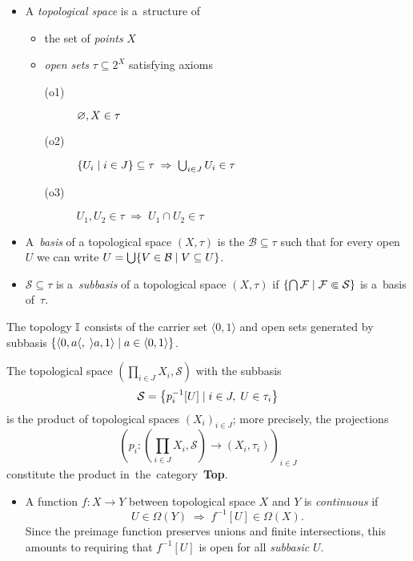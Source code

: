 \begin{itemize}
\item A \emph{topological space} is a~structure of
  \begin{itemize}
  \item the set of \emph{points\/} $X$
  \item \emph{open sets\/} $\tau\subseteq 2^X$ satisfying axioms
    \begin{description}
    \item[(o1)] $\varnothing, X \in \tau$
    \item[(o2)] $\left\{ U_i \mid i\in J \right\} \subseteq \tau \; \Rightarrow
    \; \bigcup_{i\in J} U_i \in \tau$
    \item[(o3)] $U_1, U_2 \in \tau \; \Rightarrow \; U_1 \cap U_2 \in \tau$
    \end{description}
  \end{itemize}

\item A~\emph{basis} of a topological space $(X, \tau)$ is the
$\mathcal{B}\subseteq \tau$ such that for every open $U$ we can write $U =
\bigcup \{V\in \mathcal{B} \mid V\subseteq U \}$.

\item $\mathcal{S}\subseteq \tau$ is a~\emph{subbasis} of a
topological space $(X, \tau)$ if $\left\{ \bigcap \mathcal{F} \mid \mathcal{F}
\Subset \mathcal{S} \right\}$ is a~basis of~$\tau$.
\end{itemize}

\begin{exmpl}
  The topology $\mathbb{I}$ consists of the carrier set $\langle 0, 1 \rangle$ and open
  sets generated by subbasis $\{ \langle 0, a \langle, \; \rangle a, 1 \rangle
  \mid a\in \langle 0, 1 \rangle \}$.
\end{exmpl}

\begin{exmpl}
  The topological space $\left( \prod_{i\in J} X_i, \mathcal{S} \right)$ with
  the subbasis
  \[
    \mathcal{S} = \left\{ p_{i}^{-1}[U] \mid i\in J, \; U\in \tau_i \right\}
  \]
  is the product of topological spaces $\left( X_i \right)_{i\in J}$;
  more precisely, the projections
  \[
    \left( p_i\colon \left(\prod_{i\in J} X_i, \mathcal{S}\right) \to
    \left(X_i, \tau_i\right) \right)_{i\in J}
  \]
  constitute the product in~the~category~{\bf Top}.
\end{exmpl}

\begin{itemize}
\item A function $f\colon X \to Y$ between topological space $X$ and $Y$ is
\emph{continuous} if 
\[
  U\in \Omega(Y) \; \Longrightarrow \; f^{-1}[U]\in \Omega(X).
\]
Since the preimage function preserves unions and finite intersections, this
amounts to requiring that $f^{-1}[U]$ is open for all \emph{subbasic\/} $U$.
\end{itemize}

